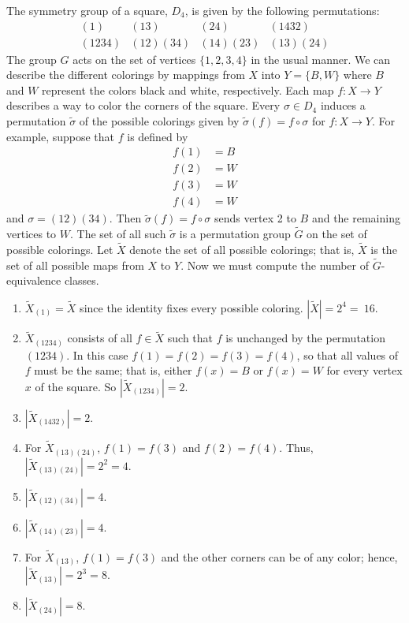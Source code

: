  
The  symmetry group of a square, $D_4$, is given by the following
permutations: 
\[
\begin{array}{cccc}
(1)    & (13)     & (24)     & (1432) \\
(1234) & (12)(34) & (14)(23) & (13)(24)
\end{array}
\]
The group $G$ acts on the set of vertices $\{ 1, 2, 3, 4\}$ in the
usual manner. We can describe the different colorings by mappings from
$X$ into $Y = \{ B, W \}$ where $B$ and $W$ represent the colors black
and white, respectively. Each map $f : X \rightarrow Y$ describes a
way to color the corners of the square. Every $\sigma \in D_4$ induces
a permutation $\widetilde{ \sigma }$ of the possible colorings given
by $\widetilde{\sigma}(f) = f \circ \sigma$ for $f : X \rightarrow Y$.
For example, suppose that $f$ is defined by 
\begin{align*}
f(1) & =  B \\
f(2) & =  W \\
f(3) & =  W \\
f(4) & =  W
\end{align*}
and $\sigma = (1 2)(3 4)$. Then $\widetilde{\sigma}(f) = f \circ
\sigma$ sends vertex 2 to $B$ and the remaining vertices to $W$. The
set of all such $\widetilde{\sigma}$ is a permutation group
$\widetilde{G}$ on the set of possible colorings. Let $\widetilde{X}$
denote the set of all possible colorings; that is, $\widetilde{X}$ is
the set of all possible maps from $X$ to $Y$.  Now we must compute the
number of $\widetilde{G}$-equivalence classes. 
\begin{enumerate}
 
\item
$\widetilde{X}_{(1)} = \widetilde{X}$ since the identity fixes every
possible coloring. $|\widetilde{X}| = 2^4 =~16$.
 
\item
$\widetilde{X}_{(1 2 3 4)}$ consists of all $f \in \widetilde{X}$ such
that $f$ is unchanged by the permutation $(1 23 4)$. In this case
$f(1) = f(2) = f(3) = f(4)$, so that all values of $f$ must be the 
same; that is, either $f(x)= B$ or $f(x)= W$ for every vertex $x$ of 
the square. So $|\widetilde{X}_{(1 2 3 4)}| = 2$.
 
\item 
$|\widetilde{X}_{(1 4 3 2)}| = 2$.
 
\item 
For $\widetilde{X}_{(1 3)(2 4)}$, $f(1) = f(3)$ and $f(2) =
f(4)$. Thus, $|\widetilde{X}_{(13)(24)}| = 2^2 = 4$.
 
\item 
$|\widetilde{X}_{(1 2)(3 4)}| = 4$.
 
\item 
$|\widetilde{X}_{(1 4)(2 3)}| = 4$.
 
\item 
For $\widetilde{X}_{(1  3 )}$, $f(1) = f(3)$ and the other corners can
be of any color; hence, $|\widetilde{X}_{(1 3)}| = 2^3 = 8$.
 
\item 
$|\widetilde{X}_{(2 4)}| = 8$.
 
\end{enumerate}
